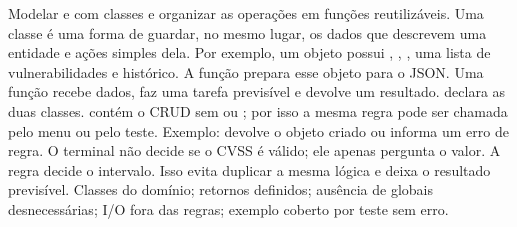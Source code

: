 
 Modelar  e  com classes e organizar as operações em funções reutilizáveis.
 Uma classe é uma forma de guardar, no mesmo lugar, os dados que descrevem uma entidade e ações simples dela. Por exemplo, um objeto  possui , , , uma lista de vulnerabilidades e histórico. A função  prepara esse objeto para o JSON. Uma função recebe dados, faz uma tarefa previsível e devolve um resultado.
  declara as duas classes.  contém o CRUD sem  ou ; por isso a mesma regra pode ser chamada pelo menu ou pelo teste. Exemplo:  devolve o objeto criado ou informa um erro de regra.
 O terminal não decide se o CVSS é válido; ele apenas pergunta o valor. A regra  decide o intervalo. Isso evita duplicar a mesma lógica e deixa o resultado previsível.
 Classes do domínio; retornos definidos; ausência de globais desnecessárias; I/O fora das regras; exemplo coberto por teste sem erro.

